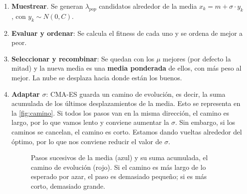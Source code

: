 \begin{enumerate}
    \item \textbf{Muestrear}. Se generan $\lambda_{pop}$ candidatos alrededor de la media $x_{k}=m+\sigma\cdot y_{k}$, con $y_{k}\sim N(0,C)$.
    \item \textbf{Evaluar y ordenar}: Se calcula el fitness de cada uno y se ordena de mejor a peor. 
    \item \textbf{Seleccionar y recombinar}: Se quedan con los $\mu$ mejores (por defecto la mitad) y la nueva media es una \textbf{media ponderada} de ellos, con más peso al mejor. La nube se desplaza hacia donde están los buenos. 
    \item \textbf{Adaptar $\sigma$}: CMA-ES guarda un camino de evolución, es decir, la suma acumulada de los últimos desplazamientos de la media. Esto se representa en la \autoref{fig:camino}. Si todos los pasos van en la misma dirección, el camino es largo, por lo que vamos lento y conviene aumentar la $\sigma$. Sin embargo, si los caminos se cancelan, el camino es corto. Estamos dando vueltas alrededor del óptimo, por lo que nos conviene reducir el valor de $\sigma$. 
    
    \begin{figure}[htbp]
    \centering
    \caption{Pasos sucesivos de la media (azul) y su suma acumulada, el camino de
    evolución (rojo). Si el camino es más largo de lo esperado por azar, el paso es
    demasiado pequeño; si es más corto, demasiado grande.}
    \label{fig:camino}
    \end{figure}


\end{enumerate}
